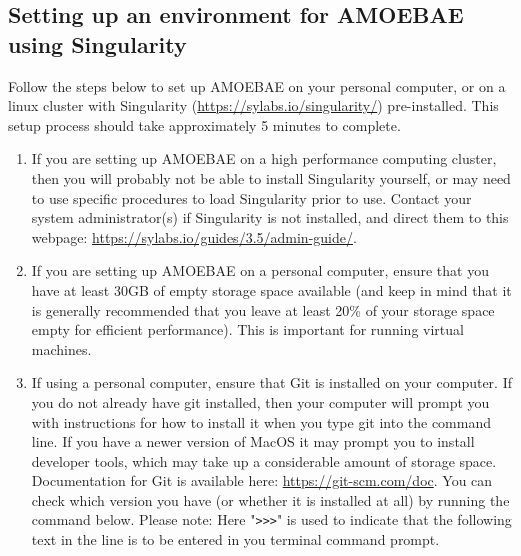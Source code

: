\documentclass[12pt,letterpaper]{article}
\begin{document}
\begin{linenumbers}
\begin{itemize}
\end{itemize}


\subsection{Setting up an environment for AMOEBAE using Singularity}
\label{setup_section}


Follow the steps below to set up AMOEBAE on your personal computer, or on a
linux cluster with Singularity (\url{https://sylabs.io/singularity/})
pre-installed.  This setup process should take approximately 5 minutes to
complete. 


\begin{enumerate}

\item If you are setting up AMOEBAE on a high performance computing cluster,
    then you will probably not be able to install Singularity yourself, or may
        need to use specific procedures to load Singularity prior to use.
        Contact your system administrator(s) if Singularity is not installed,
        and direct them to this webpage:
        \url{https://sylabs.io/guides/3.5/admin-guide/}.

\item If you are setting up AMOEBAE on a personal computer, ensure that you
    have at least 30GB of empty storage space available (and keep in mind that
        it is generally recommended that you leave at least 20\% of your
        storage space empty for efficient performance). This is important for
        running virtual machines.

\item If using a personal computer, ensure that Git is installed on your
    computer. If you do not already have git installed, then your computer will
        prompt you with instructions for how to install it when you type git
        into the command line. If you have a newer version of MacOS it may
        prompt you to install developer tools, which may take up a considerable
        amount of storage space. Documentation for Git is available here:
        \url{https://git-scm.com/doc}. You can check which version you have (or
        whether it is installed at all) by running the command below. Please
        note: Here "\texttt{>{}>{}>}" is used to indicate that the following
        text in the line is to be entered in you terminal command prompt. 


\end{enumerate}
\end{linenumbers}
\end{document}
